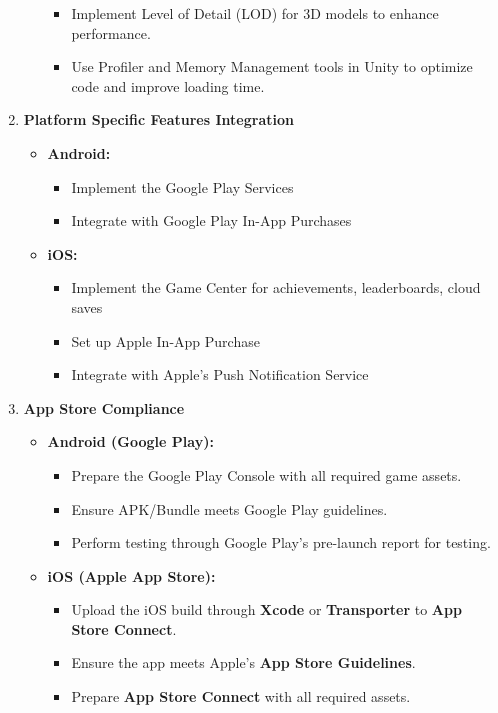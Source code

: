 \begin{enumerate}
\begin{itemize}
\begin{itemize}
			\item {Implement Level of Detail (LOD) for 3D models to enhance performance.}
			\item {Use Profiler and Memory Management tools in Unity to optimize code and improve loading time.}
		\end{itemize}
	\end{itemize}
	\item\textbf{Platform Specific Features Integration}
	\begin{itemize}
		\item \textbf{Android:}
		\begin{itemize}
			\item {Implement the Google Play Services}
			\item {Integrate with Google Play In-App Purchases}
		\end{itemize}
		\item \textbf{iOS:}
		\begin{itemize}
			\item {Implement the Game Center for achievements, leaderboards, cloud saves}
			\item {Set up Apple In-App Purchase}
			\item {Integrate with Apple's Push Notification Service}
		\end{itemize}
	\end{itemize}
	\item \textbf{App Store Compliance}
	\begin{itemize}
		\item \textbf{Android (Google Play):}
		\begin{itemize}
			\item {Prepare the Google Play Console with all required game assets.}
			\item {Ensure APK/Bundle meets Google Play guidelines.}
			\item {Perform testing through Google Play’s pre-launch report for testing.}
		\end{itemize}
		\item \textbf{iOS (Apple App Store):}
		\begin{itemize}
			\item {Upload the iOS build through \textbf{Xcode} or \textbf{Transporter} to \textbf{App Store Connect}.}
			\item {Ensure the app meets Apple’s \textbf{App Store Guidelines}.}
			\item {Prepare \textbf{App Store Connect} with all required assets.}
		\end{itemize}

\end{itemize}
\end{enumerate}
